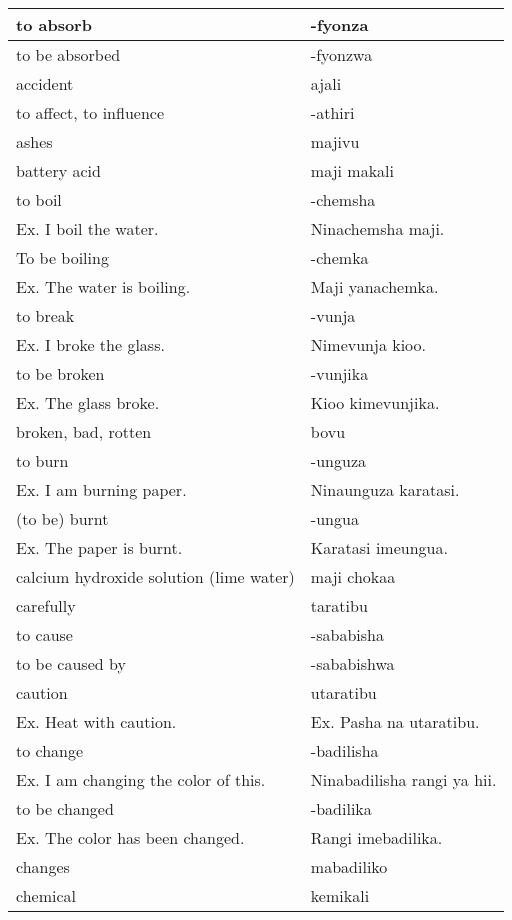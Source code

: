 \begin{center}
\begin{longtable}{|p{}|p{}|}
to absorb	&	-fyonza	\\	\hline
to be absorbed	&	-fyonzwa	\\	\hline
accident	&	ajali	\\	\hline
to affect, to influence	&	-athiri	\\	\hline
ashes	&	majivu	\\	\hline
battery acid	&	maji makali	\\	\hline
to boil 	&	-chemsha 	\\	
        Ex. I boil the water.	&	        Ninachemsha maji.	\\	\hline
To be boiling 	&	-chemka 	\\	
        Ex. The water is boiling.	&	        Maji yanachemka.	\\	\hline
to break 	&	-vunja 	\\	
        Ex. I broke the glass.	&	        Nimevunja kioo.	\\	\hline
to be broken 	&	-vunjika 	\\	
        Ex. The glass broke.	&	        Kioo kimevunjika.	\\	\hline
broken, bad, rotten	&	bovu	\\	\hline
to burn	&	-unguza 	\\	
        Ex. I am burning paper.  	&	        Ninaunguza karatasi.	\\	\hline
(to be) burnt	&	-ungua 	\\	
        Ex. The paper is burnt.	&	        Karatasi imeungua.	\\	\hline
calcium hydroxide solution (lime water)	&	maji chokaa	\\	\hline
carefully	&	taratibu	\\	\hline
to cause	&	-sababisha	\\	\hline
to be caused by	&	-sababishwa	\\	\hline
caution 	&	utaratibu 	\\	
        Ex. Heat with caution.	&	        Ex. Pasha na utaratibu.	\\	\hline
to change 	&	-badilisha 	\\	
        Ex. I am changing the color of this.	&	        Ninabadilisha rangi ya hii. 	\\	\hline
to be changed 	&	-badilika 	\\	
        Ex. The color has been changed. 	&	        Rangi imebadilika.	\\	\hline
changes	&	mabadiliko	\\	\hline
chemical	&	kemikali	\\	\hline

\end{longtable}
\end{center}

